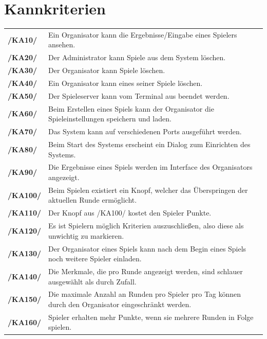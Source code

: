 \documentclass[a4paper]{scrreprt}
\begin{document}
    \section{Kannkriterien}
    \begin{tabularx}{\linewidth}{@{}>{\bfseries}l@{\hspace{.5em}}X@{}} %
        /KA10/ & Ein \Gls{Organisator} kann die Ergebnisse/Eingabe eines Spielers ansehen. \\
        /KA20/ & Der \Gls{Administrator} kann Spiele aus dem System löschen. \\
        /KA30/ & Der \Gls{Organisator} kann Spiele löschen. \\
        /KA40/ & Ein \Gls{Organisator} kann eines seiner \Gls{Spiel}e löschen. \\
        /KA50/ & Der \Gls{Spieleserver} kann vom Terminal aus beendet werden. \\
        /KA60/ & Beim Erstellen eines Spiels kann der \Gls{Organisator} die \Gls{Spieleinstellungen} speichern und laden. \\
        /KA70/ & Das System kann auf verschiedenen Ports ausgeführt werden. \\
        /KA80/ & Beim Start des Systems erscheint ein Dialog zum Einrichten des Systems. \\
        /KA90/ & Die Ergebnisse eines \Gls{Spiel}s werden im Interface des \Gls{Organisator}s angezeigt. \\
        /KA100/ & Beim Spielen existiert ein Knopf, welcher das Überspringen der aktuellen Runde ermöglicht. \\
        /KA110/ & Der Knopf aus /KA100/ kostet den \Gls{Spieler} Punkte. \\ %
        /KA120/ & Es ist \Gls{Spieler}n möglich Kriterien auszuschließen, also diese als unwichtig zu markieren. \\
        /KA130/ & Der \Gls{Organisator} eines Spiels kann nach dem Begin eines Spiels noch weitere Spieler einladen. \\
        /KA140/ & Die Merkmale, die pro Runde angezeigt werden, sind schlauer ausgewählt als durch Zufall. \\ %
        /KA150/ & Die maximale Anzahl an Runden pro Spieler pro Tag können durch den \Gls{Organisator} eingeschränkt werden. \\
        /KA160/ & \Gls{Spieler} erhalten mehr Punkte, wenn sie mehrere Runden in Folge spielen. \\

\end{tabularx}
\end{document}
